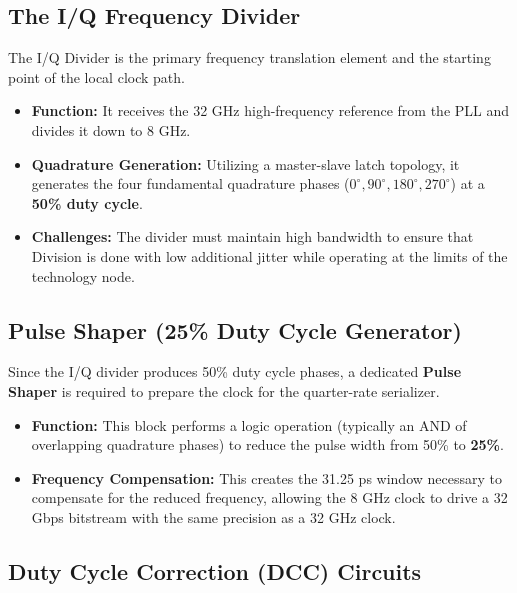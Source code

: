 \subsection{The I/Q Frequency Divider}
\label{subsec:iq-divider}

The I/Q Divider is the primary frequency translation element and the starting point of the local clock path.

\begin{itemize}
    \item \textbf{Function:} It receives the 32 GHz high-frequency reference from the PLL and divides it down to 8 GHz.
    
    \item \textbf{Quadrature Generation:} Utilizing a master-slave latch topology, it generates the four fundamental quadrature phases (\(0^\circ, 90^\circ, 180^\circ, 270^\circ\)) at a \textbf{50\% duty cycle}.
    
    \item \textbf{Challenges:} The divider must maintain high bandwidth to ensure that Division is done with low additional  jitter while operating at the limits of the technology node.
\end{itemize}

\subsection{Pulse Shaper (25\% Duty Cycle Generator)}
\label{subsec:pulse-shaper}

Since the I/Q divider produces 50\% duty cycle phases, a dedicated \textbf{Pulse Shaper} is required to prepare the clock for the quarter-rate serializer.

\begin{itemize}
    \item \textbf{Function:} This block performs a logic operation (typically an AND of overlapping quadrature phases) to reduce the pulse width from 50\% to \textbf{25\%}.
    
    \item \textbf{Frequency Compensation:} This creates the 31.25 ps window necessary to compensate for the reduced frequency, allowing the 8 GHz clock to drive a 32 Gbps bitstream with the same precision as a 32 GHz clock.
\end{itemize}

\subsection{Duty Cycle Correction (DCC) Circuits}
\label{subsec:dcc-circuits}

